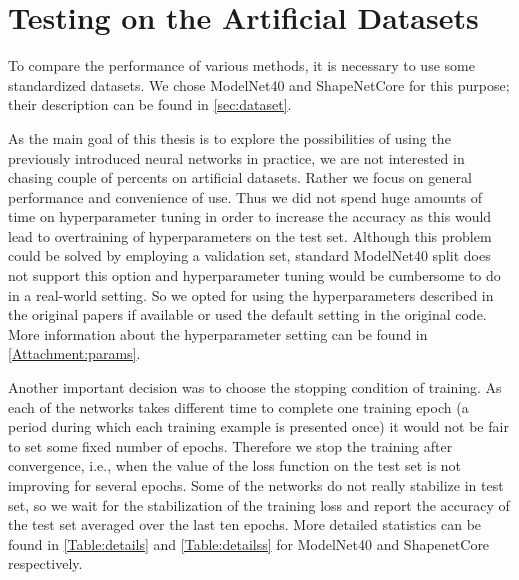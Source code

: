 \section{Testing on the Artificial Datasets}
To compare the performance of various methods, it is necessary to use some standardized datasets. We chose ModelNet40 and ShapeNetCore for this purpose; their description can be found in \autoref{sec:dataset}. \par
As the main goal of this thesis is to explore the possibilities of using the previously introduced neural networks in practice, we are not interested in chasing couple of percents on artificial datasets. Rather we focus on general performance and convenience of use. Thus we did not spend huge amounts of time on hyperparameter tuning in order to increase the accuracy as this would lead to overtraining of hyperparameters on the test set. Although this problem could be solved by employing a validation set, standard ModelNet40 split does not support this option and hyperparameter tuning would be cumbersome to do in a real-world setting. So we opted for using the hyperparameters described in the original papers if available or used the default setting in the original code. More information about the hyperparameter setting can be found in \autoref{Attachment:params}. \par
Another important decision was to choose the stopping condition of training. As each of the networks takes different time to complete one training epoch (a period during which each training example is presented once) it would not be fair to set some fixed number of epochs. Therefore we stop the training after convergence, i.e., when the value of the loss function on the test set is not improving for several epochs. Some of the networks do not really stabilize in test set, so we wait for the stabilization of the training loss and report the accuracy of the test set averaged over the last ten epochs. More detailed statistics can be found in \autoref{Table:details} and \autoref{Table:detailss} for ModelNet40 and ShapenetCore respectively.


